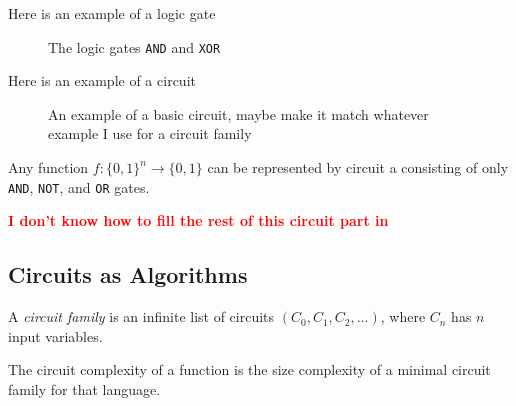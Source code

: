         \begin{example}
         Here is an example of a logic gate

         \begin{figure}[ht]
            \centering
            \placeholderfig
            \caption{ The logic gates \texttt{AND} and \texttt{XOR} }
        \end{figure}
        \end{example}

        \bigskip

        \begin{example}
            Here is an example of a circuit

            \begin{figure}[h]
                \centering
                    \placeholderfig
                \caption{An example of a basic circuit, maybe make it match whatever example I use for a circuit 
                family}
            \end{figure}

    
        \end{example}

        \begin{theorem}
            Any function $f : \{0, 1\}^n \rightarrow \{0, 1\}$ can be represented by circuit a consisting of only 
            \texttt{AND}, \texttt{NOT}, and \texttt{OR} gates.
        \end{theorem}
        
        {\textcolor{red}{\bfseries I don't know how to fill the rest of this circuit part in}}
        

        \subsection{Circuits as Algorithms}
        
        \begin{definition}
                 A \emph{circuit family} is an infinite list of circuits $(C_0, C_1, C_2, ...)$, where $C_n$ has 
                 $n$ input variables.
        \end{definition}

        \begin{definition}
            The circuit complexity of a function is the size complexity of a minimal circuit family for that 
            language. 
        \end{definition}

